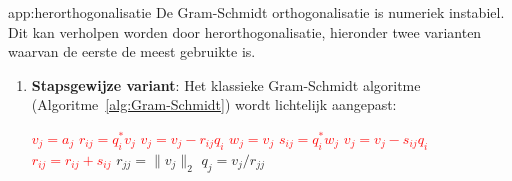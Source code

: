 \begin{app}{app:herorthogonalisatie}
    De Gram-Schmidt orthogonalisatie is numeriek instabiel. Dit kan verholpen worden door herorthogonalisatie, hieronder twee varianten waarvan de eerste de meest gebruikte is.
    \begin{enumerate}
        \item \textbf{Stapsgewijze variant}: Het klassieke Gram-Schmidt algoritme (Algoritme~\ref{alg:Gram-Schmidt}) wordt lichtelijk aangepast:
                    \begin{tcolorbox}[colback=white, colframe=gray, arc=0mm] 
                    \begin{algorithmic}[1]
                        \State \textcolor{red}{$v_j = a_j$}
                            \State \textcolor{red}{$r_{ij} = q_i^* v_j$}
                            \State \textcolor{red}{$v_j = v_j - r_{ij} q_i$}
                        \EndFor
                        \State
                        \State \textcolor{red}{$w_j = v_j$}
                            \State \textcolor{red}{$s_{ij} = q_i^* w_j$}
                            \State \textcolor{red}{$v_j = v_j - s_{ij} q_i$}
                            \State \textcolor{red}{$r_{ij} = r_{ij} + s_{ij}$}
                        \EndFor
                        \State
                        \State $r_{jj} = \|v_j\|_2$
                        \State $q_j = v_j / r_{jj}$
                    \EndFor
                    \end{algorithmic}
                \end{tcolorbox}

\end{enumerate}
\end{app}
